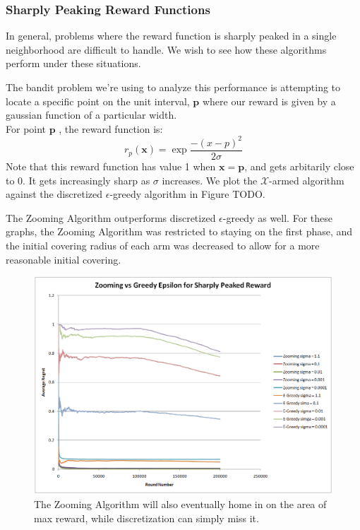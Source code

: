 \subsubsection{Sharply Peaking Reward Functions}
In general, problems where the reward function is sharply peaked in a single neighborhood
are difficult to handle. We wish to see how these algorithms perform under these situations.

The bandit problem we're using to analyze this performance is attempting to locate a specific
point on the unit interval, $\mathbf{p}$ where our reward is given by a gaussian function of a particular width.\\
For point  $\mathbf{p}$ , the reward function is:
\[
	r_p(\mathbf{x}) = \exp{\frac{-(x-p)^2}{2\sigma}}
\]
Note that this reward function has value 1 when
$\mathbf{x} = \mathbf{p}$, and gets arbitarily close to 0.  It gets
increasingly sharp as $\sigma$ increases.  We plot the
$\mathcal{X}$-armed algorithm against the discretized $\epsilon$-greedy
algorithm in Figure TODO.

The Zooming Algorithm outperforms discretized $\epsilon$-greedy as well.
For these graphs, the Zooming Algorithm was restricted to staying on the first phase,
and the initial covering radius of each arm was decreased to allow for a more reasonable
initial covering.


\begin{figure}[!ht]
  \begin{center}
    \includegraphics[width=5 in]{figures/ZoomingEpsilonBump.png}
     \caption{The Zooming Algorithm will also eventually home in on the area of max reward, while discretization can simply miss it.}
     \label{fig:zoomebump}
  \end{center}
\end{figure}

